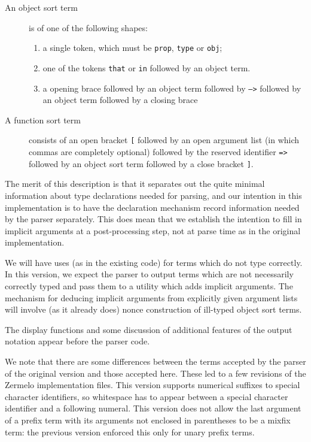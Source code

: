 \documentclass[12pt]{article}
\begin{document}
\begin{description}
\item [An object sort term] is of one of the following shapes:

\begin{enumerate}

\item a single token, which must be {\tt prop},  {\tt type} or {\tt obj};

\item  one of the tokens {\tt that} or {\tt in} followed by an object term.

\item a opening brace followed by an object term followed by {\tt -->} followed by an object term followed by a closing brace

\end{enumerate}

\item [A function sort term] consists of an open bracket \verb|[| followed by an open argument list (in which commas are completely optional) followed by the reserved identifier {\tt =>} followed by an object  sort term followed by
a close bracket \verb|]|.

\end{description}

The merit of this description is that it separates out the quite minimal information about type declarations needed for parsing, and our intention in this implementation is to have the declaration mechanism record information needed by the  parser separately.  This does mean that we establish the intention to fill in implicit arguments at a post-processing step, not at parse time as in the original implementation.

We will have uses (as in the existing code) for terms which do not type correctly.  In this version, we expect the parser to output terms which are not necessarily correctly typed
and pass them to a utility which adds implicit arguments.  The mechanism for deducing implicit arguments from explicitly given argument lists will involve (as it already does)
nonce construction of ill-typed object sort terms.

The display functions and some discussion of additional features of the output notation appear before the parser code.

We note that there are some differences between the terms accepted by the parser of the original version and those accepted here.  These led to a few revisions of the Zermelo implementation files.  This version supports numerical suffixes to special character identifiers, so whitespace has to appear between a special character identifier and a following numeral.  This version does not allow the last argument of a prefix term with its arguments not enclosed in parentheses to be a mixfix term:  the previous version enforced this only for unary prefix terms.
\end{document}
